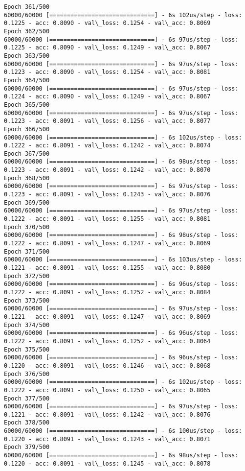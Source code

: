 \documentclass[11pt]{article}
\begin{document}
\begin{Verbatim}[commandchars=\\\{\}]
Epoch 361/500
60000/60000 [==============================] - 6s 102us/step - loss: 0.1225 - acc: 0.8090 - val\_loss: 0.1254 - val\_acc: 0.8069
Epoch 362/500
60000/60000 [==============================] - 6s 97us/step - loss: 0.1225 - acc: 0.8090 - val\_loss: 0.1249 - val\_acc: 0.8067
Epoch 363/500
60000/60000 [==============================] - 6s 97us/step - loss: 0.1223 - acc: 0.8090 - val\_loss: 0.1254 - val\_acc: 0.8081
Epoch 364/500
60000/60000 [==============================] - 6s 97us/step - loss: 0.1224 - acc: 0.8090 - val\_loss: 0.1249 - val\_acc: 0.8067
Epoch 365/500
60000/60000 [==============================] - 6s 97us/step - loss: 0.1223 - acc: 0.8091 - val\_loss: 0.1256 - val\_acc: 0.8077
Epoch 366/500
60000/60000 [==============================] - 6s 102us/step - loss: 0.1222 - acc: 0.8091 - val\_loss: 0.1242 - val\_acc: 0.8074
Epoch 367/500
60000/60000 [==============================] - 6s 98us/step - loss: 0.1223 - acc: 0.8091 - val\_loss: 0.1242 - val\_acc: 0.8070
Epoch 368/500
60000/60000 [==============================] - 6s 97us/step - loss: 0.1223 - acc: 0.8091 - val\_loss: 0.1243 - val\_acc: 0.8076
Epoch 369/500
60000/60000 [==============================] - 6s 97us/step - loss: 0.1222 - acc: 0.8091 - val\_loss: 0.1255 - val\_acc: 0.8081
Epoch 370/500
60000/60000 [==============================] - 6s 98us/step - loss: 0.1222 - acc: 0.8091 - val\_loss: 0.1247 - val\_acc: 0.8069
Epoch 371/500
60000/60000 [==============================] - 6s 103us/step - loss: 0.1221 - acc: 0.8091 - val\_loss: 0.1255 - val\_acc: 0.8080
Epoch 372/500
60000/60000 [==============================] - 6s 96us/step - loss: 0.1222 - acc: 0.8091 - val\_loss: 0.1252 - val\_acc: 0.8084
Epoch 373/500
60000/60000 [==============================] - 6s 97us/step - loss: 0.1221 - acc: 0.8091 - val\_loss: 0.1247 - val\_acc: 0.8069
Epoch 374/500
60000/60000 [==============================] - 6s 96us/step - loss: 0.1222 - acc: 0.8091 - val\_loss: 0.1252 - val\_acc: 0.8064
Epoch 375/500
60000/60000 [==============================] - 6s 96us/step - loss: 0.1220 - acc: 0.8091 - val\_loss: 0.1246 - val\_acc: 0.8068
Epoch 376/500
60000/60000 [==============================] - 6s 102us/step - loss: 0.1222 - acc: 0.8091 - val\_loss: 0.1250 - val\_acc: 0.8065
Epoch 377/500
60000/60000 [==============================] - 6s 97us/step - loss: 0.1221 - acc: 0.8091 - val\_loss: 0.1242 - val\_acc: 0.8076
Epoch 378/500
60000/60000 [==============================] - 6s 100us/step - loss: 0.1220 - acc: 0.8091 - val\_loss: 0.1243 - val\_acc: 0.8071
Epoch 379/500
60000/60000 [==============================] - 6s 98us/step - loss: 0.1220 - acc: 0.8091 - val\_loss: 0.1245 - val\_acc: 0.8078

\end{Verbatim}
\end{document}
